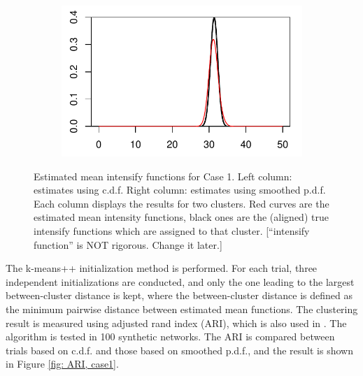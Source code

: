 \begin{figure}[H]
\begin{minipage}{.49\textwidth}
\begin{subfigure}{\linewidth}
\end{subfigure}
\begin{subfigure}{\linewidth}
\includegraphics[width=\linewidth]{../simulation/plots/pp_case1_clus2.pdf}
\end{subfigure}
\end{minipage}

\caption{Estimated mean intensify functions for Case 1. Left column: estimates using c.d.f. Right column: estimates using smoothed p.d.f.
Each column displays the results for two clusters.
Red curves are the estimated mean intensity functions, black ones are the (aligned) true intensify functions which are assigned to that cluster.
[``intensify function'' is NOT rigorous. Change it later.]
}
\label{fig: clustering result, case1}
\end{figure}


\noindent
The k-means++ initialization method is performed. 
For each trial, three independent initializations are conducted, and only the one leading to the largest 
between-cluster distance
is kept, where the between-cluster distance is defined as the minimum pairwise distance between estimated mean  functions.
The clustering result is measured using adjusted rand index (ARI), which is also used in \cite{Matias2018}.
The algorithm is tested in 100 synthetic networks. 
The ARI is compared between trials based on c.d.f. and those based on smoothed p.d.f.,
and the result is shown in Figure \ref{fig: ARI, case1}.


